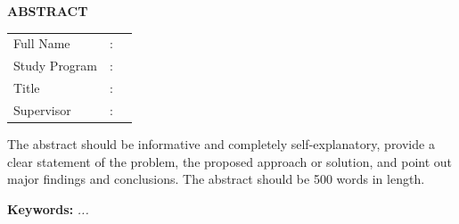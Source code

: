 \clearpage
\begingroup

\begin{center}
	\fontsize{14bp}{1.5\baselineskip}\selectfont \textbf{ABSTRACT}
\end{center}
\vspace{1.5\baselineskip} %

\noindent
\begin{tabular}{@{}p{3.5cm} @{}c@{ } p{10.5cm}@{}}
	Full Name      & : & \AUTHOR \\[8pt]
	Study Program  & : & \STUDYPROGRAM \\[8pt]
	Title          & : & \TITLE \\[8pt]
	Supervisor     & : & \SUPERVISORONE 
\end{tabular}


\noindent The abstract should be informative and completely self-explanatory, provide a clear statement of the problem, the proposed approach or solution, and point out major findings and conclusions. The abstract should be 500 words in length. 


\noindent \textbf{Keywords:} \textit{...}
\endgroup
\pagebreak